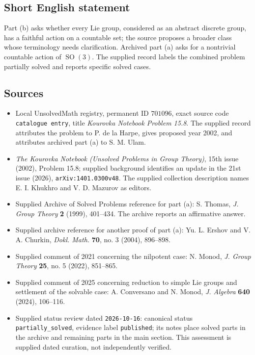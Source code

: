\documentclass[11pt]{article}
\begin{document}
\subsection{Short English statement}
Part (b) asks whether every Lie group, considered as an abstract discrete group, has a faithful action on a countable set; the source proposes a broader class whose terminology needs clarification. Archived part (a) asks for a nontrivial countable action of \(\operatorname{SO}(3)\). The supplied record labels the combined problem partially solved and reports specific solved cases.
\subsection{Sources}
\begin{itemize}
\item Local UnsolvedMath registry, permanent ID \(701096\), exact source code \texttt{catalogue entry}, title \emph{Kourovka Notebook Problem 15.8}. The supplied record attributes the problem to P. de la Harpe, gives proposed year 2002, and attributes archived part (a) to S. M. Ulam.
\item \emph{The Kourovka Notebook (Unsolved Problems in Group Theory)}, 15th issue (2002), Problem 15.8; supplied background identifies an update in the 21st issue (2026), \texttt{arXiv:1401.0300v48}. The supplied collection description names E. I. Khukhro and V. D. Mazurov as editors.
\item Supplied Archive of Solved Problems reference for part (a): S. Thomas, \emph{J. Group Theory} \textbf{2} (1999), 401--434. The archive reports an affirmative answer.
\item Supplied archive reference for another proof of part (a): Yu. L. Ershov and V. A. Churkin, \emph{Dokl. Math.} \textbf{70}, no. 3 (2004), 896--898.
\item Supplied comment of 2021 concerning the nilpotent case: N. Monod, \emph{J. Group Theory} \textbf{25}, no. 5 (2022), 851--865.
\item Supplied comment of 2025 concerning reduction to simple Lie groups and settlement of the solvable case: A. Conversano and N. Monod, \emph{J. Algebra} \textbf{640} (2024), 106--116.
\item Supplied status review dated \texttt{2026-10-16}: canonical status \texttt{partially\_solved}, evidence label \texttt{published}; its notes place solved parts in the archive and remaining parts in the main section. This assessment is supplied dated curation, not independently verified.
\end{itemize}
\end{document}
